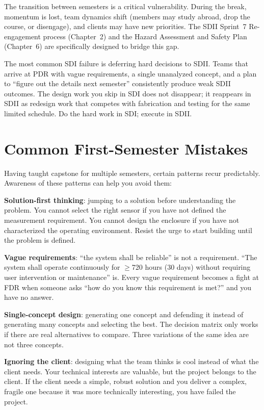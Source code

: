 The transition between semesters is a critical vulnerability. During the break, momentum is lost, team dynamics shift (members may study abroad, drop the course, or disengage), and clients may have new priorities. The SDII Sprint~7 Re-engagement process (Chapter~2) and the Hazard Assessment and Safety Plan (Chapter~6) are specifically designed to bridge this gap.

\begin{warningbox}
The most common SDI failure is deferring hard decisions to SDII. Teams that arrive at PDR with vague requirements, a single unanalyzed concept, and a plan to ``figure out the details next semester'' consistently produce weak SDII outcomes. The design work you skip in SDI does not disappear; it reappears in SDII as redesign work that competes with fabrication and testing for the same limited schedule. Do the hard work in SDI; execute in SDII.
\end{warningbox}

\section{Common First-Semester Mistakes}
Having taught capstone for multiple semesters, certain patterns recur predictably. Awareness of these patterns can help you avoid them:

\textbf{Solution-first thinking}: jumping to a solution before understanding the problem. You cannot select the right sensor if you have not defined the measurement requirement. You cannot design the enclosure if you have not characterized the operating environment. Resist the urge to start building until the problem is defined.

\textbf{Vague requirements}: ``the system shall be reliable'' is not a requirement. ``The system shall operate continuously for $\geq$720 hours (30 days) without requiring user intervention or maintenance'' is. Every vague requirement becomes a fight at FDR when someone asks ``how do you know this requirement is met?'' and you have no answer.

\textbf{Single-concept design}: generating one concept and defending it instead of generating many concepts and selecting the best. The decision matrix only works if there are real alternatives to compare. Three variations of the same idea are not three concepts.

\textbf{Ignoring the client}: designing what the team thinks is cool instead of what the client needs. Your technical interests are valuable, but the project belongs to the client. If the client needs a simple, robust solution and you deliver a complex, fragile one because it was more technically interesting, you have failed the project.

